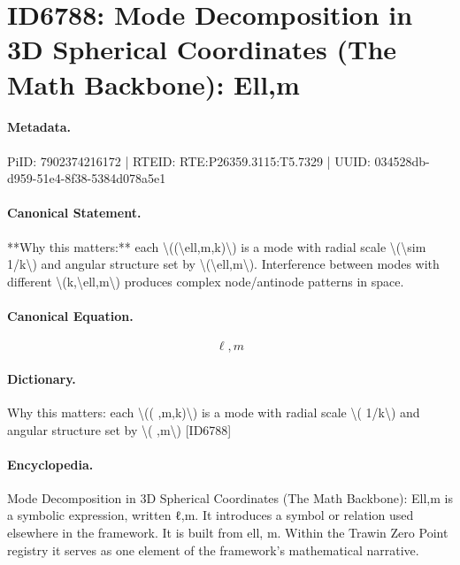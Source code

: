\section*{ID6788: Mode Decomposition in 3D Spherical Coordinates (The Math Backbone): Ell,m}
\paragraph{Metadata.}
PiID: 7902374216172 | RTEID: RTE:P26359.3115:T5.7329 | UUID: 034528db-d959-51e4-8f38-5384d078a5e1

\paragraph{Canonical Statement.}
**Why this matters:** each \textbackslash{}((\textbackslash{}ell,m,k)\textbackslash{}) is a mode with radial scale \textbackslash{}(\textbackslash{}sim 1/k\textbackslash{}) and angular structure set by \textbackslash{}(\textbackslash{}ell,m\textbackslash{}). Interference between modes with different \textbackslash{}(k,\textbackslash{}ell,m\textbackslash{}) produces complex node/antinode patterns in space.

\paragraph{Canonical Equation.}
\[
\ell,m
\]

\paragraph{Dictionary.}
Why this matters: each \textbackslash{}(( ,m,k)\textbackslash{}) is a mode with radial scale \textbackslash{}( 1/k\textbackslash{}) and angular structure set by \textbackslash{}( ,m\textbackslash{}) [ID6788]

\paragraph{Encyclopedia.}
Mode Decomposition in 3D Spherical Coordinates (The Math Backbone): Ell,m is a symbolic expression, written ℓ,m. It introduces a symbol or relation used elsewhere in the framework. It is built from ell, m. Within the Trawin Zero Point registry it serves as one element of the framework's mathematical narrative.
